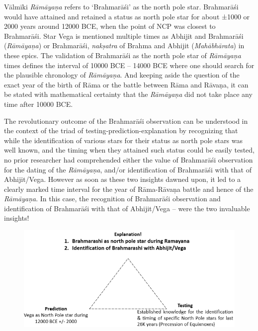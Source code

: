 Vālmīki \textit{Rāmāyaṇa} refers to ‘Brahmarāśi’ as the north pole star. Brahmarāśi would have attained and retained a status as north pole star for about ±1000 or 2000 years around 12000 BCE, when the point of NCP was closest to Brahmarāśi. Star Vega is mentioned multiple times as Abhijit and Brahmarāśi (\textit{Rāmāyaṇa}) or Brahmarāśi, \textit{nakṣatra} of Brahma and Abhijit (\textit{Mahābhārata}) in these epics. The validation of Brahmarāśi as the north pole star of \textit{Rāmāyaṇa} times defines the interval of 10000 BCE – 14000 BCE where one should search for the plausible chronology of \textit{Rāmāyaṇa}. And keeping aside the question of the exact year of the birth of Rāma or the battle between Rāma and Rāvaṇa, it can be stated with mathematical certainty that the \textit{Rāmāyaṇa} did not take place any time after 10000 BCE.

The revolutionary outcome of the Brahmarāśi observation can be understood in the context of the triad of testing-prediction-explanation by recognizing that while the identification of various stars for their status as north pole stars was well known, and the timing when they attained such status could be easily tested, no prior researcher had comprehended either the value of Brahmarāśi observation for the dating of the \textit{Rāmāyaṇa}, and/or identification of Brahmarāśi with that of Abhijit/Vega. However as soon as these two insights dawned upon, it led to a clearly marked time interval for the year of Rāma-Rāvaṇa battle and hence of the \textit{Rāmāyaṇa}. In this case, the recognition of Brahmarāśi observation and identification of Brahmarāśi with that of Abhijit/Vega – were the two invaluable insights!

\begin{figure}[!h]
\includegraphics[scale=.4]{images/chap2-11.jpg}
\end{figure}

